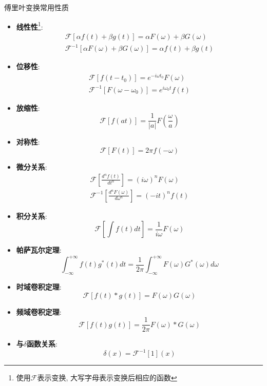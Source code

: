\documentclass[a4paper,zihao=-4,linespread=1]{ctexrep}
\begin{document}
    \begin{proposition}{傅里叶变换常用性质}
        \begin{itemize}
            \item \textbf{线性性}\footnote{使用$\mathscr{F}$表示变换, 大写字母表示变换后相应的函数}:$$
            \begin{gathered}
            \mathscr{F}[\alpha f(t)+\beta g(t)]=\alpha F(\omega)+\beta G(\omega) \\
            \mathscr{F}^{-1}[\alpha F(\omega)+\beta G(\omega)]=\alpha f(t)+\beta g(t)
            \end{gathered}$$
            \item \textbf{位移性}:$$
            \begin{gathered}
            \mathscr{F}\left[f\left(t-t_{0}\right)\right]=e^{-i \omega t_{0}} F(\omega) \\
            \mathscr{F}^{-1}\left[F\left(\omega-\omega_{0}\right)\right]=e^{i \omega_{0} t} f(t)
            \end{gathered}
            $$
            \item \textbf{放缩性}:$$
            \mathscr{F}[f(a t)]=\frac{1}{|a|} F\left(\frac{\omega}{a}\right)
            $$
            \item \textbf{对称性}:$$
            \mathscr{F}[F(t)]=2 \pi f(-\omega)
            $$
            \item \textbf{微分关系}:$$
            \begin{gathered}
            \mathscr{F}\left[\frac{d^{n} f(t)}{d t^{n}}\right]=(i \omega)^{n} F(\omega) \\
            \mathscr{F}^{-1}\left[\frac{d^{n} F(\omega)}{d \omega^{n}}\right]=(-i t)^{n} f(t)
            \end{gathered}$$
            \item \textbf{积分关系}:$$\mathscr{F}\left[\int f(t)dt\right]=\frac{1}{i\omega}F(\omega)$$
            \item \textbf{帕萨瓦尔定理}:$$
            \int_{-\infty}^{+\infty} f(t) g^*(t) d t=\frac{1}{2 \pi} \int_{-\infty}^{+\infty} F(\omega) G^*(\omega) d \omega
            $$
            \item \textbf{时域卷积定理}:$$
            \mathscr{F}[f(t) * g(t)]=F(\omega) G(\omega)
            $$
            \item \textbf{频域卷积定理}:$$
            \mathscr{F}[f(t) g(t)]=\frac{1}{2 \pi} F(\omega) * G(\omega)
            $$
            \item \textbf{与$\delta$函数关系}:$$\delta(x)=\mathscr{F}^{-1}[1](x)$$
        \end{itemize}
    \end{proposition}
\end{document}

